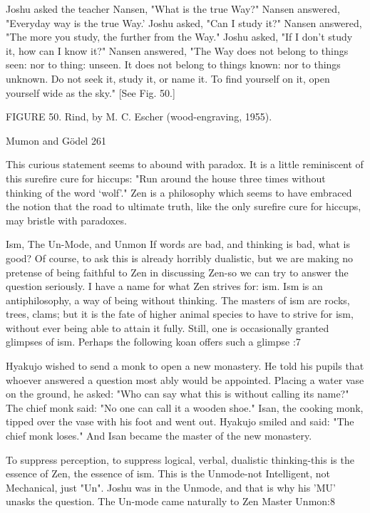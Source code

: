    Joshu asked the teacher Nansen, "What is the true Way?"
   Nansen answered, "Everyday way is the true Way.' Joshu asked, "Can I study it?"
   Nansen answered, "The more you study, the further from the Way." Joshu asked, "If I
   don't study it, how can I know it?"
   Nansen answered, "The Way does not belong to things seen: nor to thing: unseen. It
   does not belong to things known: nor to things unknown. Do not seek it, study it, or
   name it. To find yourself on it, open yourself wide as the sky." [See Fig. 50.]

FIGURE 50. Rind, by M. C. Escher (wood-engraving, 1955).




Mumon and Gödel                                                                    261

        This curious statement seems to abound with paradox. It is a little reminiscent of
this surefire cure for hiccups: "Run around the house three times without thinking of the
word `wolf'." Zen is a philosophy which seems to have embraced the notion that the road
to ultimate truth, like the only surefire cure for hiccups, may bristle with paradoxes.

                          Ism, The Un-Mode, and Unmon
If words are bad, and thinking is bad, what is good? Of course, to ask this is already
horribly dualistic, but we are making no pretense of being faithful to Zen in discussing
Zen-so we can try to answer the question seriously. I have a name for what Zen strives
for: ism. Ism is an antiphilosophy, a way of being without thinking. The masters of ism
are rocks, trees, clams; but it is the fate of higher animal species to have to strive for ism,
without ever being able to attain it fully. Still, one is occasionally granted glimpses of
ism. Perhaps the following koan offers such a glimpse :7

   Hyakujo wished to send a monk to open a new monastery. He told his pupils that
   whoever answered a question most ably would be appointed. Placing a water vase on
   the ground, he asked: "Who can say what this is without calling its name?"
     The chief monk said: "No one can call it a wooden shoe."
     Isan, the cooking monk, tipped over the vase with his foot and went out. Hyakujo
     smiled and said: "The chief monk loses." And Isan became the
   master of the new monastery.

To suppress perception, to suppress logical, verbal, dualistic thinking-this is the essence
of Zen, the essence of ism. This is the Unmode-not Intelligent, not Mechanical, just "Un".
Joshu was in the Unmode, and that is why his 'MU' unasks the question. The Un-mode
came naturally to Zen Master Unmon:8

